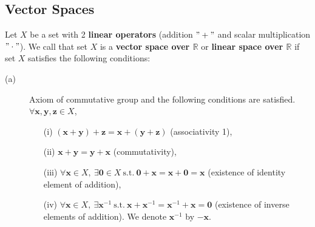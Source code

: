 \subsection{Vector Spaces}
\begin{frame}[fragile]
  \begin{defi}
    Let $X$ be a set with 2 {\bf linear operators} (addition $"+"$ and scalar multiplication $"\cdot"$).
    We call that set $X$ is a {\bf vector space over $\mathbb{R}$} or {\bf linear space over $\mathbb{R}$} if set $X$ satisfies the following conditions:
    \begin{description}
      \item[(a)] Axiom of commutative group and the following conditions are satisfied.
      $\forall\boldsymbol{x}, \boldsymbol{y}, \boldsymbol{z}\in X$,
      \begin{enumerate}
        \item[(i)] $(\boldsymbol{x}+\boldsymbol{y})+\boldsymbol{z} = \boldsymbol{x}+(\boldsymbol{y}+\boldsymbol{z})$ (associativity 1),
        \item[(ii)] $\boldsymbol{x}+\boldsymbol{y} = \boldsymbol{y}+\boldsymbol{x}$ (commutativity),
        \item[(iii)] $\forall\boldsymbol{x}\in X,\ \exists\boldsymbol{0}\in X\ \mbox{s.t.}\ \boldsymbol{0}+\boldsymbol{x} = \boldsymbol{x}+\boldsymbol{0} = \boldsymbol{x}$ (existence of identity element of addition),
        \item[(iv)] $\forall\boldsymbol{x}\in X,\ \exists\boldsymbol{x}^{-1}\ \mbox{s.t.}\ \boldsymbol{x}+\boldsymbol{x}^{-1} = \boldsymbol{x}^{-1}+\boldsymbol{x} = \boldsymbol{0}$ (existence of inverse elements of addition).
        We denote $\boldsymbol{x}^{-1}$ by $-\boldsymbol{x}$.
      \end{enumerate}
    \end{description}
  \end{defi}
\end{frame}

